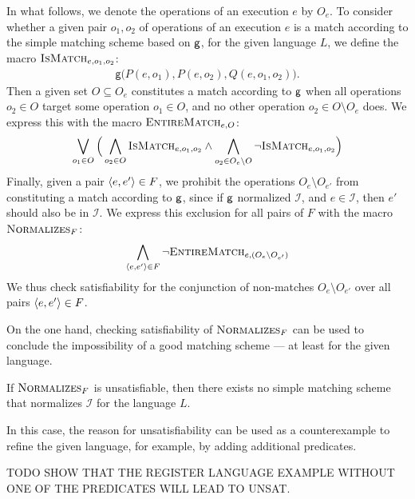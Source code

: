 In what follows, we denote the operations of an execution $e$ by $O_e$.
To consider whether a given pair $o_1, o_2$ of operations of an execution $e$
is a match according to the simple matching scheme based on ${\sf g}$, for
the given language $L$, we define the macro $\textsc{IsMatch}_{e,o_1,o_2}$:
\begin{align*}
  \mathsf{g}\big( P(e,o_1), P(e,o_2), Q(e,o_1,o_2) \big).
\end{align*}
Then a given set $O \subseteq O_e$ constitutes a match according to
${\sf g}$ when all operations $o_2 \in O$ target some operation $o_1 \in O$,
and no other operation $o_2 \in O \setminus O_e$ does. We express this with the
macro $\textsc{EntireMatch}_{e,O}$:
\begin{align*}
  \bigvee_{o_1 \in O}
  \Big(
  \bigwedge_{o_2 \in O} \textsc{IsMatch}_{e,o_1,o_2}
  \land \bigwedge_{o_2 \in O_e \setminus O} \lnot \textsc{IsMatch}_{e,o_1,o_2}
  \Big)
\end{align*}
Finally, given a pair ${\left\langle{e,e'}\right\rangle} \in F$, we prohibit the operations $O_e
\setminus O_{e'}$ from constituting a match according to ${\sf g}$, since if
${\sf g}$ normalized $\mathcal{I}$, and $e \in \mathcal{I}$, then $e'$ should
also be in $\mathcal{I}$. We express this exclusion for all pairs of $F$
with the macro $\textsc{Normalizes}_{F}$:
\begin{align*}
  \bigwedge_{{\left\langle{e,e'}\right\rangle}\in F} \lnot \textsc{EntireMatch}_{e,(O_e \setminus O_{e'})}
\end{align*}
We thus check satisfiability for the conjunction of non-matches $O_e \setminus
O_{e'}$ over all pairs ${\left\langle{e,e'}\right\rangle} \in F$.

On the one hand, checking satisfiability of $\textsc{Normalizes}_F$ can be used
to conclude the impossibility of a good matching scheme — at least for the
given language.

\begin{lemma}

  If $\textsc{Normalizes}_F$ is unsatisfiable, then there exists no simple
  matching scheme that normalizes $\mathcal{I}$ for the language $L$.

\end{lemma}

In this case, the reason for unsatisfiability can be used as a counterexample
to refine the given language, for example, by adding additional predicates.

\begin{example}

  TODO SHOW THAT THE REGISTER LANGUAGE EXAMPLE WITHOUT ONE OF THE PREDICATES
  WILL LEAD TO UNSAT.

\end{example}

